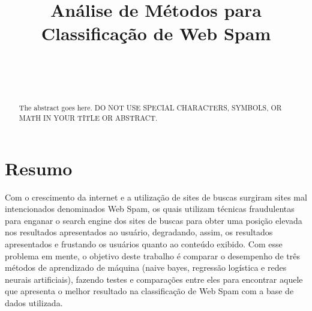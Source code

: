 \documentclass[10pt, conference, compsocconf]{IEEEtran}
\begin{document}
\title{Análise de Métodos para Classificação de Web Spam}

\author{
\\
\and
{}
\\
}
\maketitle 
\begin{abstract}
The abstract goes here. DO NOT USE SPECIAL CHARACTERS, SYMBOLS, OR MATH IN YOUR TITLE OR ABSTRACT.

\end{abstract}

\section{Resumo}
Com o crescimento da internet e a utilização de sites de buscas surgiram sites mal intencionados denominados Web Spam, os quais utilizam  técnicas fraudulentas para enganar o search engine dos sites de buscas para obter uma posição elevada nos resultados apresentados ao usuário, degradando, assim, os resultados apresentados e frustando os usuários quanto ao conteúdo exibido.
Com esse problema em mente, o objetivo deste trabalho é comparar o desempenho de três métodos de aprendizado de máquina (naive bayes, regressão logística e redes neurais artificiais), fazendo testes e comparações entre eles para encontrar aquele que apresenta o melhor resultado na classificação de Web Spam com a base de dados utilizada.
\end{document}
